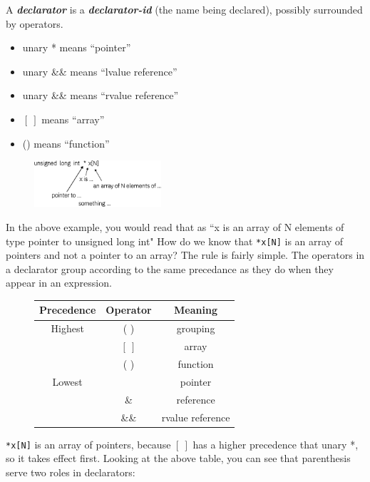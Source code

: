 \documentclass{report}
\begin{document}
A \textit{\textbf{declarator}} is a \textit{\textbf{declarator-id}} (the name being declared), possibly surrounded by operators.
\begin{itemize}
    \item unary * means ``pointer''
    \item unary \&& means ``lvalue reference''
    \item unary \&\& means ``rvalue reference''
    \item $[ \ ]$ means ``array''
        \item() means ``function''
\end{itemize}
\begin{figure}[ht]
\centering
\includegraphics[width=0.42\textwidth]{ ./figures/2.png }
\end{figure}
In the above example, you would read that as ``x is an array of N elements of type pointer to unsigned long int"
\newpage
\noindent How do we know that \texttt{*x[N]} is an array of pointers and not a pointer to an array? The rule is fairly simple. The operators in a declarator group according to the same precedance as they do when they appear in an expression.
    \begin{figure}[H]
    \centering
     \setlength{\tabcolsep}{30}
    \begin{tabular}{ccc}
    \toprule 
    Precedence & Operator & Meaning \\
    \midrule
    Highest & ( ) & grouping \\
    \midrule
            & $[ \ ]$ & array \\
            & ( )  & function \\
            \midrule
    Lowest & \* & pointer \\
           & \& & reference \\
           & \&\& & rvalue reference \\
           \bottomrule


    \end{tabular}
    \end{figure}
\noindent    \texttt{*x[N]} is an array of pointers, because $[ \ ]$ has a higher precedence that unary *, so it takes effect first.
\bigbreak \noindent
Looking at the above table, you can see that parenthesis serve two roles in declarators:
\end{document}
